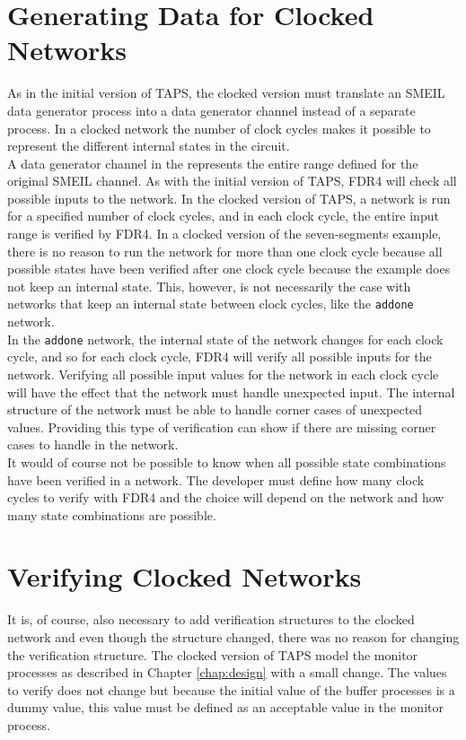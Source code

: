 \section{Generating Data for Clocked Networks}
As in the initial version of TAPS, the clocked version must translate an SMEIL data generator process into a \cspm{} data generator channel instead of a separate process. In a clocked network the number of clock cycles makes it possible to represent the different internal states in the circuit.\\

A data generator channel in \cspm{} the represents the entire range defined for the original SMEIL channel. As with the initial version of TAPS, FDR4 will check all possible inputs to the network.
In the clocked version of TAPS, a network is run for a specified number of clock cycles, and in each clock cycle, the entire input range is verified by FDR4.
In a clocked version of the seven-segments example, there is no reason to run the network for more than one clock cycle because all possible states have been verified after one clock cycle because the example does not keep an internal state. This, however, is not necessarily the case with networks that keep an internal state between clock cycles, like the \texttt{addone} network.\\

In the \texttt{addone} network, the internal state of the network changes for each clock cycle, and so for each clock cycle, FDR4 will verify all possible inputs for the network. Verifying all possible input values for the network in each clock cycle will have the effect that the network must handle unexpected input. The internal structure of the network must be able to handle corner cases of unexpected values. Providing this type of verification can show if there are missing corner cases to handle in the network.\\

It would of course not be possible to know when all possible state combinations have been verified in a network. The developer must define how many clock cycles to verify with FDR4 and the choice will depend on the network and how many state combinations are possible.

\section{Verifying Clocked Networks}
It is, of course, also necessary to add verification structures to the clocked \cspm{} network and even though the structure changed, there was no reason for changing the verification structure. The clocked version of TAPS model the monitor processes as described in Chapter \ref{chap:design} with a small change. The values to verify does not change but because the initial value of the buffer processes is a dummy value, this value must be defined as an acceptable value in the monitor process. \\

